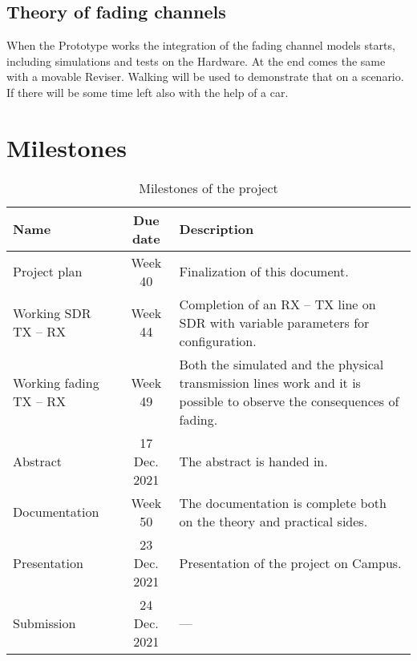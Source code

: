 \documentclass[a4paper, twosided, 11pt]{scrartcl}
\begin{document}
\subsection{Theory of fading channels}
When the Prototype works the integration of the fading channel models starts, including simulations and tests on the Hardware. 
At the end comes the same with a movable Reviser. Walking will be used to demonstrate that on a scenario. If there will be some time left also with the help of a car.

\newpage
\section{Milestones}

\begin{table}[h]
	\centering
	\caption{Milestones of the project}
	\renewcommand\arraystretch{1.2}
	\begin{tabularx}{\linewidth}{l c X}
		\toprule
		\bfseries Name & \bfseries Due date & \bfseries Description \\
		\midrule
		Project plan & Week 40 & 
			Finalization of this document. \\

		Working SDR TX -- RX  & Week 44 &
			Completion of an RX -- TX line on SDR with variable parameters for configuration. \\

		Working fading TX -- RX & Week 49 &
			Both the simulated and the physical transmission lines work and it is possible to observe the consequences of fading.\\
			
		Abstract & 17 Dec. 2021 &
			The abstract is handed in. \\

		Documentation & Week 50 &
			The documentation is complete both on the theory and practical sides. \\

		Presentation & 23 Dec. 2021 &
			Presentation of the project on Campus. \\
		Submission & 24 Dec. 2021 & --- \\
		\bottomrule
	\end{tabularx}
\end{table}

\appendix
\end{document}
